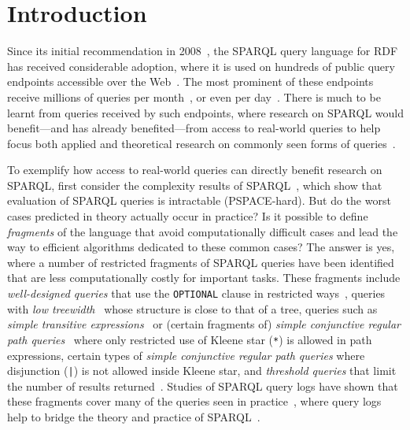 \section{Introduction} 

Since its initial recommendation in 2008~\cite{SPARQLquery}, the SPARQL query language for RDF has received considerable adoption, where it is used on hundreds of public query endpoints accessible over the Web~\cite{VandenbusscheUM17}. The most prominent of these endpoints receive millions of queries per month~\cite{AriasFMF11}, or even per day~\cite{MalyshevKGGB18}. There is much to be learnt from queries received by such endpoints, %
where research on SPARQL would benefit---and has already benefited---from access to real-world queries to help focus both applied and theoretical research on commonly seen forms of queries~\cite{MartensT19}.

To exemplify how access to real-world queries can directly benefit research on SPARQL, first consider the complexity results of SPARQL~\cite{PerezAG09}, which show that evaluation of SPARQL queries is intractable (PSPACE-hard). But do the worst cases predicted in theory actually occur in practice? Is it possible to define \textit{fragments} of the language that avoid computationally difficult cases and lead the way to efficient algorithms dedicated to these common cases? The answer is yes, where a number of restricted fragments of SPARQL queries have been identified that are less computationally costly for important tasks. These fragments include \textit{well-designed queries} that use the \texttt{OPTIONAL} clause in restricted ways~\cite{PerezAG09,BonifatiMT17}, queries with \textit{low treewidth}~\cite{BonifatiMT17} whose structure is close to that of a tree, queries such as \textit{simple transitive expressions}~\cite{MartensT18}
or (certain fragments of) \textit{simple conjunctive regular path queries}~\cite{FigueiraGKMNT20} where only restricted use of Kleene star (\texttt{*}) is allowed in path expressions, certain types of \textit{simple conjunctive regular path queries} where disjunction (\texttt{|}) is not allowed inside Kleene star, and \textit{threshold queries} that limit the number of results returned~\cite{BonifatiDFHHMMSST21}. Studies of SPARQL query logs have shown that these fragments cover many of the queries seen in practice~\cite{BonifatiMT20,MartensT18}, where query logs help to bridge the theory and practice of SPARQL~\cite{MartensT19}. %

